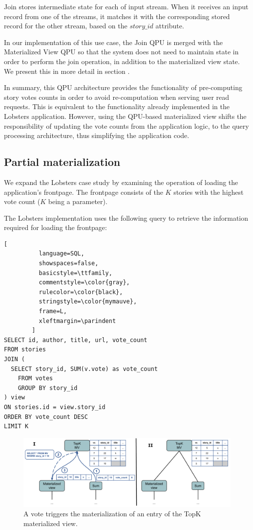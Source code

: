 \smallskip
\noindent
Join stores intermediate state for each of input stream.
When it receives an input record from one of the streams,
it matches it with the corresponding stored record for the other stream,
based on the $story\_id$ attribute.

In our implementation of this use case,
the Join QPU is merged with the Materialized View QPU so that the system does not need to maintain state
in order to perform the join operation, in addition to the materialized view state.
We present this in more detail in section .

\medskip
\noindent
In summary,
this QPU architecture provides the functionality of pre-computing story votes counts in order to avoid re-computation
when serving user read requests.
This is equivalent to the functionality already implemented in the Lobsters application.
However, using the QPU-based materialized view shifts the responsibility of updating the vote counts from the application logic,
to the query processing architecture, thus simplifying the application code.


\subsection{Partial materialization}

We expand the Lobsters case study by examining the operation of loading the application's frontpage.
The frontpage consists of the $K$ stories with the highest vote count ($K$ being a parameter).

The Lobsters implementation uses the following query to retrieve the information required for loading the frontpage:

\begin{lstlisting}[
          language=SQL,
          showspaces=false,
          basicstyle=\ttfamily,
          commentstyle=\color{gray},
          rulecolor=\color{black},
          stringstyle=\color{mymauve},
          frame=L,
          xleftmargin=\parindent
        ]
SELECT id, author, title, url, vote_count
FROM stories
JOIN (
  SELECT story_id, SUM(v.vote) as vote_count
	FROM votes
	GROUP BY story_id
) view
ON stories.id = view.story_id
ORDER BY vote_count DESC
LIMIT K
\end{lstlisting}

\begin{figure}[t]
  \centering
    \includegraphics[scale=0.4]{./figures/case_studies/lobsters_architecture_materialization.pdf}
  \caption{A vote triggers the materialization of an entry of the TopK materialized view.}
  \label{fig:lobsters_architecture_materialization}
\end{figure}

